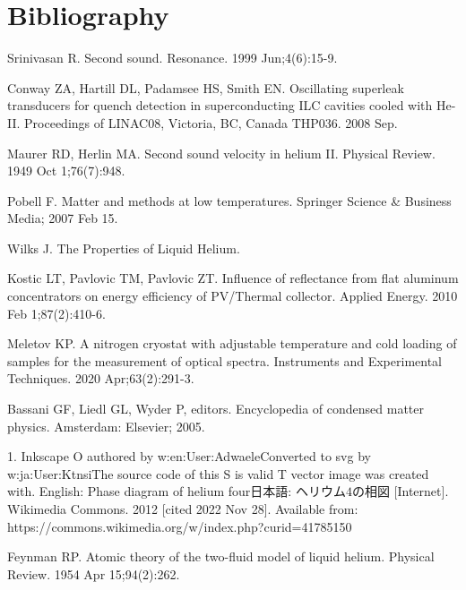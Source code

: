 \documentclass[a4paper,11pt]{article}
\begin{document}
\section{Bibliography}
\begin{thebibliography}{99}
    
     Srinivasan R. Second sound. Resonance. 1999 Jun;4(6):15-9.
  
     Conway ZA, Hartill DL, Padamsee HS, Smith EN. Oscillating superleak transducers for quench detection in superconducting ILC cavities cooled with He-II. Proceedings of LINAC08, Victoria, BC, Canada THP036. 2008 Sep.
   
     Maurer RD, Herlin MA. Second sound velocity in helium II. Physical Review. 1949 Oct 1;76(7):948.
    
    Pobell F. Matter and methods at low temperatures. Springer Science \& Business Media; 2007 Feb 15.
   
    Wilks J. The Properties of Liquid Helium.
   
    Kostic LT, Pavlovic TM, Pavlovic ZT. Influence of reflectance from flat aluminum concentrators on energy efficiency of PV/Thermal collector. Applied Energy. 2010 Feb 1;87(2):410-6.
   
    Meletov KP. A nitrogen cryostat with adjustable temperature and cold loading of samples for the measurement of optical spectra. Instruments and Experimental Techniques. 2020 Apr;63(2):291-3.
    
    Bassani GF, Liedl GL, Wyder P, editors. Encyclopedia of condensed matter physics. Amsterdam: Elsevier; 2005.
    
    1. Inkscape O authored by w:en:User:AdwaeleConverted to svg by w:ja:User:KtnsiThe source code of this S is valid T vector image was created with. English:  Phase diagram of helium four$日本語$: $ヘリウム4の相図$ [Internet]. Wikimedia Commons. 2012 [cited 2022 Nov 28]. Available from: https://commons.wikimedia.org/w/index.php?curid=41785150
    
    Feynman RP. Atomic theory of the two-fluid model of liquid helium. Physical Review. 1954 Apr 15;94(2):262.
  

\end{thebibliography}
\end{document}
